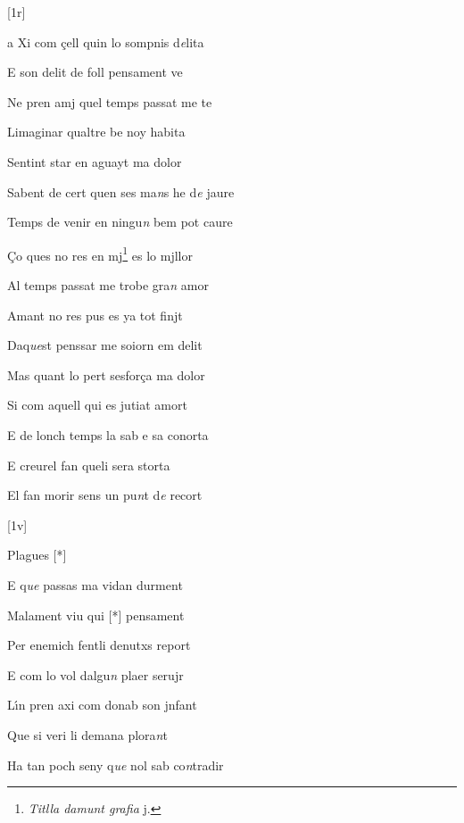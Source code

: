 



[1r]
\begin{estrofa}

 a Xi com \c{c}ell quin lo sompnis d\textit{e}lita

 E son delit de foll pensament ve

 Ne pren amj quel temps passat me te

 Limaginar qualtre be noy habita

 Sentint star en aguayt ma dolor

 Sabent de cert  quen ses ma\textit{n}s he d\textit{e} jaure

 Temps  de venir en ningu\textit{n} bem pot caure

 \c{C}o ques no res en mj\footnote{\textit{Titlla damunt grafia} j.} es lo mjllor

\end{estrofa}



\begin{estrofa}

 Al temps passat me trobe gra\textit{n} amor

 Amant no res pus es ya tot finjt

 Daq\textit{ue}st penssar  me soiorn em delit

 Mas quant lo pert sesfor\c{c}a ma dolor

 Si com aquell qui es jutiat amort

 E de lonch temps la sab e sa conorta

 E creurel fan queli sera storta

 El fan morir  sens un pu\textit{n}t d\textit{e} recort

\end{estrofa}


[1v]
\begin{estrofa}

 Plagues [*]

 E q\textit{ue} passas ma vidan durment

 Malament  viu qui [*] pensament

 Per enemich fentli denutxs report

 E com lo vol dalgu\textit{n} plaer serujr

 L\'{\i}n pren axi com donab son jnfant

 Que si veri li demana plora\textit{n}t

 Ha tan poch seny q\textit{ue} nol sab co\textit{n}tradir

\end{estrofa}



